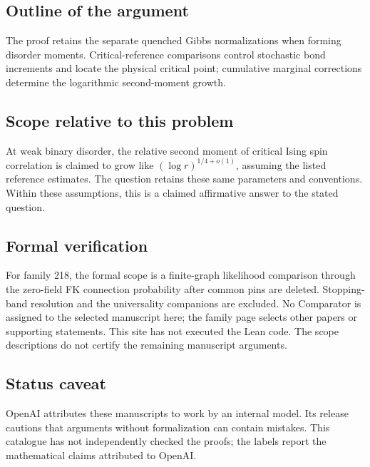 \documentclass[11pt]{article}
\begin{document}
\subsection{Outline of the argument}
The proof retains the separate quenched Gibbs normalizations when forming disorder moments. Critical-reference comparisons control stochastic bond increments and locate the physical critical point; cumulative marginal corrections determine the logarithmic second-moment growth.

\subsection{Scope relative to this problem}
At weak binary disorder, the relative second moment of critical Ising spin correlation is claimed to grow like $(\log r)^{1/4+o(1)}$, assuming the listed reference estimates. The question retains these same parameters and conventions. Within these assumptions, this is a claimed affirmative answer to the stated question.

\subsection{Formal verification}
For family 218, the formal scope is a finite-graph likelihood comparison through the zero-field FK connection probability after common pins are deleted. Stopping-band resolution and the universality companions are excluded. No Comparator is assigned to the selected manuscript here; the family page selects other papers or supporting statements. This site has not executed the Lean code. The scope descriptions do not certify the remaining manuscript arguments.

\subsection{Status caveat}
OpenAI attributes these manuscripts to work by an internal model. Its release cautions that arguments without formalization can contain mistakes. This catalogue has not independently checked the proofs; the labels report the mathematical claims attributed to OpenAI.
\end{document}
